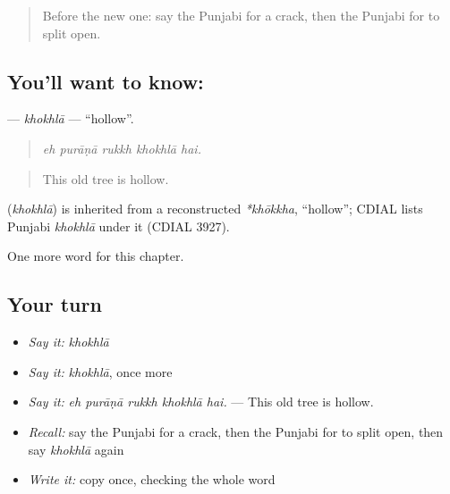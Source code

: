 \begin{quote}
Before the new one: say the Punjabi for a crack, then the Punjabi for to split open.
\end{quote}

\subsection*{You'll want to know: }
\textbf{} — \emph{khokhlā} — \textquotedblleft{}hollow\textquotedblright{}.

\begin{quote}
    
\end{quote}

\begin{quote}
\emph{eh purāṇā rukkh khokhlā hai.}
\end{quote}

\begin{quote}
This old tree is hollow.
\end{quote}

\begin{cousinweb}
\textbf{} (\emph{khokhlā}) is inherited from a reconstructed \emph{*khōkkha}, \textquotedblleft{}hollow\textquotedblright{}; CDIAL lists Punjabi \emph{khokhlā} under it (CDIAL 3927).
\end{cousinweb}

\begin{grammarlens}[title={What you've built}]
One more word for this chapter.
\end{grammarlens}

\subsection*{Your turn}
\begin{itemize}
\raggedright
  \item \emph{Say it:} \emph{khokhlā}
  \item \emph{Say it:} \emph{khokhlā}, once more
  \item \emph{Say it:} \emph{eh purāṇā rukkh khokhlā hai.} — This old tree is hollow.
  \item \emph{Recall:} say the Punjabi for a crack, then the Punjabi for to split open, then say \emph{khokhlā} again
  \item \emph{Write it:} copy \textbf{} once, checking the whole word
\end{itemize}

